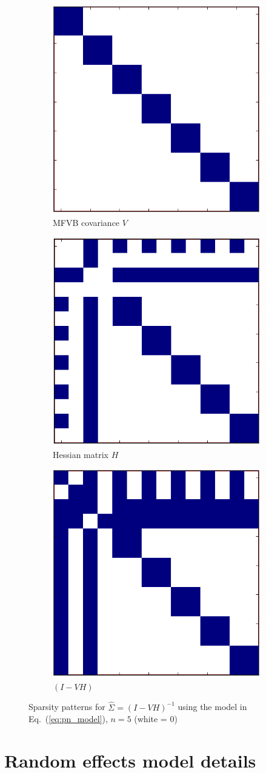 \documentclass{article}\usepackage[]{graphicx}\usepackage[]{color}
\newcommand{\eq}[1]{Eq.~(\ref{eq:#1})}
\newcommand{\truecov}{\Sigma} %
\theoremstyle{plain}
\begin{document}
\begin{figure}[ht!]
  \centering
  \begin{subfigure}{0.3\linewidth}
    \centering
    \includegraphics[height=0.3 \linewidth]{./cov_modified.png}
    \caption{\label{fig:V_sparse} MFVB covariance $V$}
  \end{subfigure}
  \begin{subfigure}{0.3\linewidth}
    \centering
    \includegraphics[height=0.3 \linewidth]{./hessian_modified.png}
    \caption{\label{fig:H_sparse} Hessian matrix $H$}
  \end{subfigure}
  \begin{subfigure}{0.3\linewidth}
    \centering
    \includegraphics[height=0.3 \linewidth]{./lrvb_modified.png}
    \caption{\label{fig:IVH_sparse} \mbox{$(I - VH)$}}
  \end{subfigure}
  \caption{Sparsity patterns for $\hat\truecov = (I - VH)^{-1}$ using the model in \eq{pn_model}, $n = 5$ (white = 0)}
  \label{fig:sparsity_patterns}
\end{figure}



\section{Random effects model details} \label{app:re_details}
\end{document}
